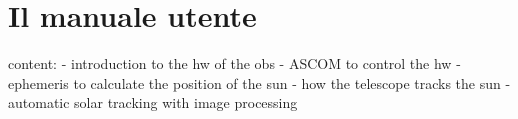\chapter{Il manuale utente}
\label{appendiceD}
\thispagestyle{empty}
content:
- introduction to the hw of the obs
- ASCOM to control the hw
- ephemeris to calculate the position of the sun
- how the telescope tracks the sun
- automatic solar tracking with image processing
